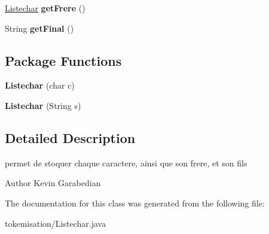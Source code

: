 \begin{DoxyCompactItemize}
\item 
\hyperlink{classtokemisation_1_1_listechar}{Listechar} {\bfseries get\+Frere} ()\hypertarget{classtokemisation_1_1_listechar_a51907515c716c508d49faeff3d0adc5b}{}\label{classtokemisation_1_1_listechar_a51907515c716c508d49faeff3d0adc5b}

\item 
String {\bfseries get\+Final} ()\hypertarget{classtokemisation_1_1_listechar_ab310a59ec0373dc564ad64188232d7ba}{}\label{classtokemisation_1_1_listechar_ab310a59ec0373dc564ad64188232d7ba}

\end{DoxyCompactItemize}
\subsection*{Package Functions}
\begin{DoxyCompactItemize}
\item 
{\bfseries Listechar} (char c)\hypertarget{classtokemisation_1_1_listechar_af6d00e4d9114fe038aaa47584815ead7}{}\label{classtokemisation_1_1_listechar_af6d00e4d9114fe038aaa47584815ead7}

\item 
{\bfseries Listechar} (String s)\hypertarget{classtokemisation_1_1_listechar_aadf199d6282a461e96c2c9fcf85e72d0}{}\label{classtokemisation_1_1_listechar_aadf199d6282a461e96c2c9fcf85e72d0}

\end{DoxyCompactItemize}


\subsection{Detailed Description}
permet de stoquer chaque caractere, ainsi que son frere, et son fils 

\begin{DoxyAuthor}{Author}
Kevin Garabedian 
\end{DoxyAuthor}


The documentation for this class was generated from the following file\+:\begin{DoxyCompactItemize}
\item 
tokemisation/Listechar.\+java\end{DoxyCompactItemize}
